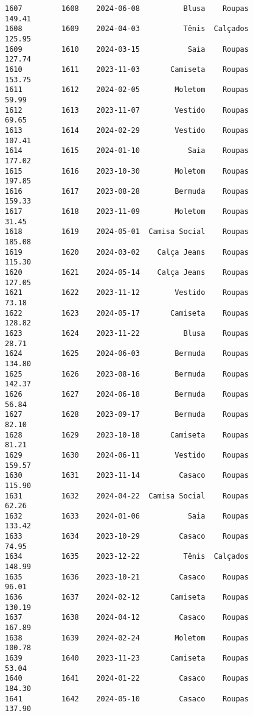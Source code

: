 \documentclass[11pt]{article}
\begin{document}
\begin{Verbatim}[commandchars=\\\{\}]
1607         1608    2024-06-08          Blusa    Roupas          149.41   
1608         1609    2024-04-03          Tênis  Calçados          125.95   
1609         1610    2024-03-15           Saia    Roupas          127.74   
1610         1611    2023-11-03       Camiseta    Roupas          153.75   
1611         1612    2024-02-05        Moletom    Roupas           59.99   
1612         1613    2023-11-07        Vestido    Roupas           69.65   
1613         1614    2024-02-29        Vestido    Roupas          107.41   
1614         1615    2024-01-10           Saia    Roupas          177.02   
1615         1616    2023-10-30        Moletom    Roupas          197.85   
1616         1617    2023-08-28        Bermuda    Roupas          159.33   
1617         1618    2023-11-09        Moletom    Roupas           31.45   
1618         1619    2024-05-01  Camisa Social    Roupas          185.08   
1619         1620    2024-03-02    Calça Jeans    Roupas          115.30   
1620         1621    2024-05-14    Calça Jeans    Roupas          127.05   
1621         1622    2023-11-12        Vestido    Roupas           73.18   
1622         1623    2024-05-17       Camiseta    Roupas          128.82   
1623         1624    2023-11-22          Blusa    Roupas           28.71   
1624         1625    2024-06-03        Bermuda    Roupas          134.80   
1625         1626    2023-08-16        Bermuda    Roupas          142.37   
1626         1627    2024-06-18        Bermuda    Roupas           56.84   
1627         1628    2023-09-17        Bermuda    Roupas           82.10   
1628         1629    2023-10-18       Camiseta    Roupas           81.21   
1629         1630    2024-06-11        Vestido    Roupas          159.57   
1630         1631    2023-11-14         Casaco    Roupas          115.90   
1631         1632    2024-04-22  Camisa Social    Roupas           62.26   
1632         1633    2024-01-06           Saia    Roupas          133.42   
1633         1634    2023-10-29         Casaco    Roupas           74.95   
1634         1635    2023-12-22          Tênis  Calçados          148.99   
1635         1636    2023-10-21         Casaco    Roupas           96.01   
1636         1637    2024-02-12       Camiseta    Roupas          130.19   
1637         1638    2024-04-12         Casaco    Roupas          167.89   
1638         1639    2024-02-24        Moletom    Roupas          100.78   
1639         1640    2023-11-23       Camiseta    Roupas           53.04   
1640         1641    2024-01-22         Casaco    Roupas          184.30   
1641         1642    2024-05-10         Casaco    Roupas          137.90   

\end{Verbatim}
\end{document}
